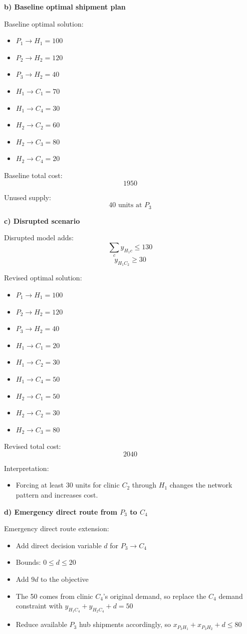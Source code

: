 \documentclass[11pt,a4paper]{article}
\begin{document}
\textbf{b) Baseline optimal shipment plan}

Baseline optimal solution:
\begin{itemize}
\item $P_1 \to H_1 = 100$
\item $P_2 \to H_2 = 120$
\item $P_3 \to H_2 = 40$
\item $H_1 \to C_1 = 70$
\item $H_1 \to C_4 = 30$
\item $H_2 \to C_2 = 60$
\item $H_2 \to C_3 = 80$
\item $H_2 \to C_4 = 20$
\end{itemize}

Baseline total cost:
\[
1950
\]

Unused supply:
\[
40 \text{ units at } P_3
\]

\textbf{c) Disrupted scenario}

Disrupted model adds:
\[
\sum_c y_{H_1 c} \le 130
\]
\[
y_{H_1 C_2} \ge 30
\]

Revised optimal solution:
\begin{itemize}
\item $P_1 \to H_1 = 100$
\item $P_2 \to H_2 = 120$
\item $P_3 \to H_2 = 40$
\item $H_1 \to C_1 = 20$
\item $H_1 \to C_2 = 30$
\item $H_1 \to C_4 = 50$
\item $H_2 \to C_1 = 50$
\item $H_2 \to C_2 = 30$
\item $H_2 \to C_3 = 80$
\end{itemize}

Revised total cost:
\[
2040
\]

Interpretation:
\begin{itemize}
\item Forcing at least 30 units for clinic $C_2$ through $H_1$ changes the network pattern and increases cost.
\end{itemize}

\textbf{d) Emergency direct route from $P_3$ to $C_4$}

Emergency direct route extension:
\begin{itemize}
\item Add direct decision variable $d$ for $P_3 \to C_4$
\item Bounds: $0 \le d \le 20$
\item Add $9d$ to the objective
\item The 50 comes from clinic $C_4$'s original demand, so replace the $C_4$ demand constraint with $y_{H_1 C_4} + y_{H_2 C_4} + d = 50$
\item Reduce available $P_3$ hub shipments accordingly, so $x_{P_3 H_1} + x_{P_3 H_2} + d \le 80$
\end{itemize}
\end{document}
